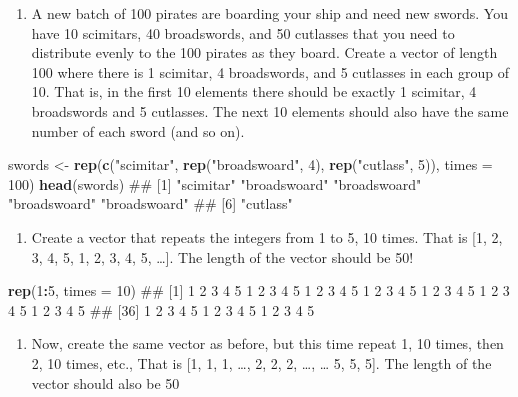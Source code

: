 \documentclass[]{book}
\newenvironment{Shaded}{\begin{snugshade}}{\end{snugshade}}
\newcommand{\KeywordTok}[1]{\textcolor[rgb]{0.13,0.29,0.53}{\textbf{#1}}}
\newcommand{\DataTypeTok}[1]{\textcolor[rgb]{0.13,0.29,0.53}{#1}}
\newcommand{\DecValTok}[1]{\textcolor[rgb]{0.00,0.00,0.81}{#1}}
\newcommand{\StringTok}[1]{\textcolor[rgb]{0.31,0.60,0.02}{#1}}
\newcommand{\OperatorTok}[1]{\textcolor[rgb]{0.81,0.36,0.00}{\textbf{#1}}}
\newcommand{\NormalTok}[1]{#1}
\providecommand{\tightlist}{%
  \setlength{\itemsep}{0pt}\setlength{\parskip}{0pt}}
\theoremstyle{definition}
\theoremstyle{definition}
\theoremstyle{remark}
\begin{document}
\begin{enumerate}
\def\labelenumi{\arabic{enumi}.}
\setcounter{enumi}{4}
\tightlist
\item
  A new batch of 100 pirates are boarding your ship and need new swords.
  You have 10 scimitars, 40 broadswords, and 50 cutlasses that you need
  to distribute evenly to the 100 pirates as they board. Create a vector
  of length 100 where there is 1 scimitar, 4 broadswords, and 5
  cutlasses in each group of 10. That is, in the first 10 elements there
  should be exactly 1 scimitar, 4 broadswords and 5 cutlasses. The next
  10 elements should also have the same number of each sword (and so
  on).
\end{enumerate}

\begin{Shaded}
\begin{Highlighting}[]
\NormalTok{swords <-}\StringTok{ }\KeywordTok{rep}\NormalTok{(}\KeywordTok{c}\NormalTok{(}\StringTok{"scimitar"}\NormalTok{, }\KeywordTok{rep}\NormalTok{(}\StringTok{"broadswoard"}\NormalTok{, }\DecValTok{4}\NormalTok{), }\KeywordTok{rep}\NormalTok{(}\StringTok{"cutlass"}\NormalTok{, }\DecValTok{5}\NormalTok{)), }\DataTypeTok{times =} \DecValTok{100}\NormalTok{)}
\KeywordTok{head}\NormalTok{(swords)}
\NormalTok{## [1] "scimitar"    "broadswoard" "broadswoard" "broadswoard" "broadswoard"}
\NormalTok{## [6] "cutlass"}
\end{Highlighting}
\end{Shaded}

\begin{enumerate}
\def\labelenumi{\arabic{enumi}.}
\setcounter{enumi}{5}
\tightlist
\item
  Create a vector that repeats the integers from 1 to 5, 10 times. That
  is {[}1, 2, 3, 4, 5, 1, 2, 3, 4, 5, \ldots{}{]}. The length of the
  vector should be 50!
\end{enumerate}

\begin{Shaded}
\begin{Highlighting}[]
\KeywordTok{rep}\NormalTok{(}\DecValTok{1}\OperatorTok{:}\DecValTok{5}\NormalTok{, }\DataTypeTok{times =} \DecValTok{10}\NormalTok{)}
\NormalTok{##  [1] 1 2 3 4 5 1 2 3 4 5 1 2 3 4 5 1 2 3 4 5 1 2 3 4 5 1 2 3 4 5 1 2 3 4 5}
\NormalTok{## [36] 1 2 3 4 5 1 2 3 4 5 1 2 3 4 5}
\end{Highlighting}
\end{Shaded}

\begin{enumerate}
\def\labelenumi{\arabic{enumi}.}
\setcounter{enumi}{6}
\tightlist
\item
  Now, create the same vector as before, but this time repeat 1, 10
  times, then 2, 10 times, etc., That is {[}1, 1, 1, \ldots{}, 2, 2, 2,
  \ldots{}, \ldots{} 5, 5, 5{]}. The length of the vector should also be
  50
\end{enumerate}
\end{document}
